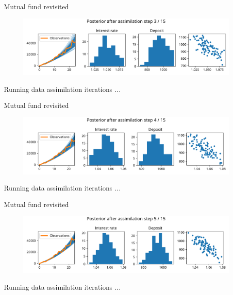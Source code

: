 \documentclass[12pt, aspectratio=149]{beamer}
\theoremstyle{plain}
\begin{document}
\begin{frame}[fragile]{Mutual fund revisited}
\vspace*{-1em}
\begin{center}
 \begin{figure}
    	\centering
    	\includegraphics[width=0.99\linewidth]{figures/esmda_step_3.pdf}
 \end{figure}
   Running data assimilation iterations ...
 \end{center}
\end{frame}

\begin{frame}[fragile]{Mutual fund revisited}
\vspace*{-1em}
\begin{center}
 \begin{figure}
    	\centering
    	\includegraphics[width=0.99\linewidth]{figures/esmda_step_4.pdf}
 \end{figure}
   Running data assimilation iterations ...
 \end{center}
\end{frame}

\begin{frame}[fragile]{Mutual fund revisited}
\vspace*{-1em}
\begin{center}
 \begin{figure}
    	\centering
    	\includegraphics[width=0.99\linewidth]{figures/esmda_step_5.pdf}
 \end{figure}
   Running data assimilation iterations ...
 \end{center}
\end{frame}
\end{document}
